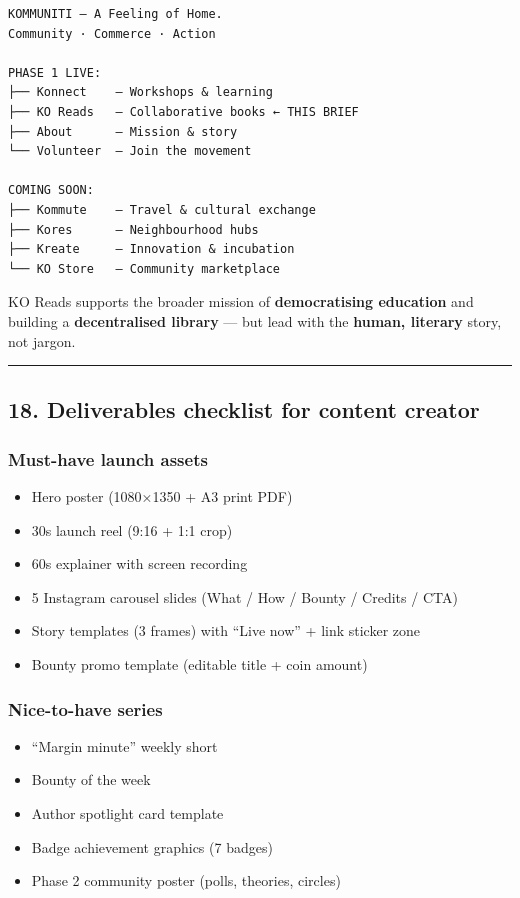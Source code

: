 \documentclass[11pt,a4paper]{report}
\begin{document}
\begin{verbatim}
KOMMUNITI — A Feeling of Home.
Community · Commerce · Action

PHASE 1 LIVE:
├── Konnect    — Workshops & learning
├── KO Reads   — Collaborative books ← THIS BRIEF
├── About      — Mission & story
└── Volunteer  — Join the movement

COMING SOON:
├── Kommute    — Travel & cultural exchange
├── Kores      — Neighbourhood hubs
├── Kreate     — Innovation & incubation
└── KO Store   — Community marketplace
\end{verbatim}

KO Reads supports the broader mission of \textbf{democratising education} and building a \textbf{decentralised library} --- but lead with the \textbf{human, literary} story, not jargon.


\medskip\hrule\medskip

\subsection{18. Deliverables checklist for content creator}

\subsubsection{Must-have launch assets}
\begin{itemize}
  \item [ ] Hero poster (1080×1350 + A3 print PDF)
  \item [ ] 30s launch reel (9:16 + 1:1 crop)
  \item [ ] 60s explainer with screen recording
  \item [ ] 5 Instagram carousel slides (What / How / Bounty / Credits / CTA)
  \item [ ] Story templates (3 frames) with “Live now” + link sticker zone
  \item [ ] Bounty promo template (editable title + coin amount)
\end{itemize}

\subsubsection{Nice-to-have series}
\begin{itemize}
  \item [ ] “Margin minute” weekly short
  \item [ ] Bounty of the week
  \item [ ] Author spotlight card template
  \item [ ] Badge achievement graphics (7 badges)
  \item [ ] Phase 2 community poster (polls, theories, circles)
\end{itemize}
\end{document}
